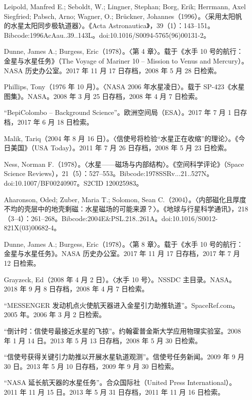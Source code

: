 \begin{enumerate}
Leipold, Manfred E.; Seboldt, W.; Lingner, Stephan; Borg, Erik; Herrmann, Axel Siegfried; Pabsch, Arno; Wagner, O.; Brückner, Johannes（1996）。〈采用太阳帆的水星太阳同步极轨道器〉。《Acta Astronautica》，39（1）：143–151。Bibcode:1996AcAau..39..143L。doi:10.1016/S0094-5765(96)00131-2。

Dunne, James A.; Burgess, Eric（1978）。〈第 4 章〉。载于《水手 10 号的航行：金星与水星任务》（The Voyage of Mariner 10 – Mission to Venus and Mercury）。NASA 历史办公室。2017 年 11 月 17 日存档，2008 年 5 月 28 日检索。

Phillips, Tony（1976 年 10 月）。〈NASA 2006 年水星凌日〉。载于 SP-423《水星图集》。NASA。2008 年 3 月 25 日存档，2008 年 4 月 7 日检索。

“BepiColombo – Background Science”。欧洲空间局（ESA）。2017 年 7 月 1 日存档，2017 年 6 月 18 日检索。

Malik, Tariq（2004 年 8 月 16 日）。〈信使号将检验“水星正在收缩”的理论〉。《今日美国》（USA Today）。2011 年 7 月 26 日存档，2008 年 5 月 23 日检索。

Ness, Norman F.（1978）。〈水星——磁场与内部结构〉。《空间科学评论》（Space Science Reviews），21（5）：527–553。Bibcode:1978SSRv...21..527N。doi:10.1007/BF00240907。S2CID 120025983。

Aharonson, Oded; Zuber, Maria T.; Solomon, Sean C.（2004）。〈内部磁化且厚度不均的壳层中的地壳剩磁：水星磁场的可能来源？〉。《地球与行星科学通讯》，218（3–4）：261–268。Bibcode:2004E&PSL.218..261A。doi:10.1016/S0012-821X(03)00682-4。

Dunne, James A.; Burgess, Eric（1978）。〈第 8 章〉。载于《水手 10 号的航行：金星与水星任务》。NASA 历史办公室。2017 年 11 月 17 日存档，2017 年 7 月 12 日检索。

Grayzeck, Ed（2008 年 4 月 2 日）。〈水手 10 号〉。NSSDC 主目录。NASA。2018 年 9 月 8 日存档，2008 年 4 月 7 日检索。

“MESSENGER 发动机点火使航天器进入金星引力助推轨道”。SpaceRef.com。2005 年。2006 年 3 月 2 日检索。

“倒计时：信使号最接近水星的飞掠”。约翰霍普金斯大学应用物理实验室。2008 年 1 月 14 日。2013 年 5 月 13 日存档，2008 年 5 月 30 日检索。

“信使号获得关键引力助推以开展水星轨道观测”。信使号任务新闻。2009 年 9 月 30 日。2013 年 5 月 10 日存档，2009 年 9 月 30 日检索。

“NASA 延长航天器的水星任务”。合众国际社（United Press International）。2011 年 11 月 15 日。2013 年 5 月 31 日存档，2011 年 11 月 16 日检索。


\end{enumerate}
